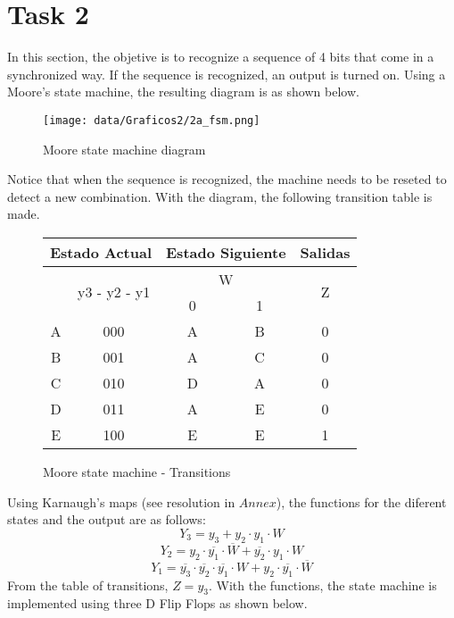 \newpage

\section*{Task 2}

In this section, the objetive is to recognize a 
sequence of 4 bits that come in a synchronized
way. If the sequence is recognized, an output 
is turned on. Using a Moore's state machine,
the resulting diagram is as shown below.

\begin{figure}[H]
    \begin{centering}
    \texttt{[image: data/Graficos2/2a\_fsm.png]}
    \par\end{centering}
    \caption{Moore state machine diagram}
\end{figure}

Notice that when the sequence is recognized, 
the machine needs to be reseted to detect a 
new combination. With the diagram, the following transition table 
is made.

\begin{figure}[H]
    \begin{centering}
\begin{tabular}{|c|c|c|c||c|}
    \hline 
    \multicolumn{2}{|c|}{Estado Actual} & \multicolumn{2}{c||}{Estado Siguiente} & \multicolumn{1}{c|}{Salidas}\tabularnewline
    \hline 
    \hline 
    \multirow{2}{*}{} & \multirow{2}{*}{y3 - y2 - y1} & \multicolumn{2}{c||}{W} & \multirow{2}{*}{Z}\tabularnewline
    \cline{3-4} 
     &  & \multicolumn{1}{c|}{0} & \multicolumn{1}{c||}{1} & \tabularnewline
    \hline 
    A & 000 & A & B & 0\tabularnewline
    \hline 
    B & 001 & A & C & 0\tabularnewline
    \hline 
    C & 010 & D & A & 0\tabularnewline
    \hline 
    D & 011 & A & E & 0\tabularnewline
    \hline 
    E & 100 & E & E & 1\tabularnewline
    \hline 
    \end{tabular}
    \caption{Moore state machine - Transitions}
\end{centering}
\end{figure}

Using Karnaugh's maps (see resolution in $Annex$), the functions for
the diferent states and the output are as follows:
$$Y_3 = y_3 + y_2 \cdot y_1 \cdot W$$ 
$$Y_2 = y_2 \cdot \overline{y_1} \cdot \overline{W} + \overline{y_2} \cdot y_1 \cdot W $$
$$Y_1 = \overline{y_3} \cdot \overline{y_2} \cdot \overline{y_1} \cdot W + y_2 \cdot \overline{y_1} \cdot \overline{W}$$
From the table of transitions, $Z = y_3$.
\newpage
With the functions, the state machine is 
implemented using three D Flip Flops as shown below.

